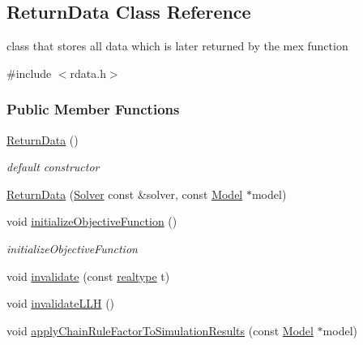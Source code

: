 \hypertarget{classamici_1_1_return_data}{}\subsection{Return\+Data Class Reference}
\label{classamici_1_1_return_data}


class that stores all data which is later returned by the mex function  




{\ttfamily \#include $<$rdata.\+h$>$}

\subsubsection*{Public Member Functions}
\begin{DoxyCompactItemize}
\item 
\mbox{\label{classamici_1_1_return_data_a4ce4db6c8f0e0ac9f21f708d042c30e5}} 
\mbox{\hyperlink{classamici_1_1_return_data_a4ce4db6c8f0e0ac9f21f708d042c30e5}{Return\+Data}} ()
\begin{DoxyCompactList}\small\item\em default constructor \end{DoxyCompactList}\item 
\mbox{\hyperlink{classamici_1_1_return_data_a9fa947e466f4c7f55d36d1e81722abdc}{Return\+Data}} (\mbox{\hyperlink{classamici_1_1_solver}{Solver}} const \&solver, const \mbox{\hyperlink{classamici_1_1_model}{Model}} $\ast$model)
\item 
\mbox{\label{classamici_1_1_return_data_a014198f2b584ac5b1a2b8a5dea13e411}} 
void \mbox{\hyperlink{classamici_1_1_return_data_a014198f2b584ac5b1a2b8a5dea13e411}{initialize\+Objective\+Function}} ()
\begin{DoxyCompactList}\small\item\em initialize\+Objective\+Function \end{DoxyCompactList}\item 
void \mbox{\hyperlink{classamici_1_1_return_data_ab320e46748c17908f0bd4bba240b8e92}{invalidate}} (const \mbox{\hyperlink{namespaceamici_a1bdce28051d6a53868f7ccbf5f2c14a3}{realtype}} t)
\item 
void \mbox{\hyperlink{classamici_1_1_return_data_a03e88745280c032d3b59fd7235665e17}{invalidate\+L\+LH}} ()
\item 
void \mbox{\hyperlink{classamici_1_1_return_data_adce202dc864a1e65d8453f597de271f5}{apply\+Chain\+Rule\+Factor\+To\+Simulation\+Results}} (const \mbox{\hyperlink{classamici_1_1_model}{Model}} $\ast$model)
\end{DoxyCompactItemize}
